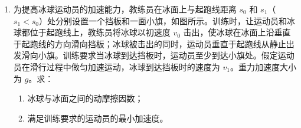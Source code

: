 \documentclass[\gkver]{gaokaozhenti}
\begin{document}
\begin{enumerate}
{	③将电阻箱 $R_z$ 的阻值置于 $2500.0 \UO$，接通 $S_1$；将 $R_1$ 的滑片置于适当位置，再反复调节 $R_2$ 的滑片 D 的位置；最终使得接通 $S_2$ 前后，微安表的示数保持不变，这说明 $S_2$ 接通前后在 $BD$ 中无电流流过，可知 B 与 D 所在位置的电势相等；

	④设滑片 P 两侧电阻分别为 $R_{21}$ 和 $R_{22}$，因 B 与 D 所在位置的电势相等，可知
	$\frac{R_{z1}}{R_{21}} = \frac{R_A}{R_{22}}$

	同理当 $R_z$ 和微安表对调后，仍有
	$\frac{R_A}{R_{21}} = \frac{R_{z2}}{R_{22}}$

	联立两式解得
	$R_A = \sqrt{R_{z1}R_{z2}} = \sqrt{2500 \times 2601} \UO = 2550 \UO$

	（3）为了提高测量精度，调节 $R_1$ 上的分压，尽可能使微安表接近满量程。
}

\item
为提高冰球运动员的加速能力，教练员在冰面上与起跑线距离 $s_0$ 和 $s_1$（$s_1 < s_0$）处分别设置一个挡板和一面小旗，如图所示。训练时，让运动员和冰球都位于起跑线上，教练员将冰球以初速度 $v_0$ 击出，使冰球在冰面上沿垂直于起跑线的方向滑向挡板；冰球被击出的同时，运动员垂直于起跑线从静止出发滑向小旗。训练要求当冰球到达挡板时，运动员至少到达小旗处。假定运动员在滑行过程中做匀加速运动，冰球到达挡板时的速度为 $v_1$。重力加速度大小为 $g$。求：
\begin{enumerate}
	\item
	冰球与冰面之间的动摩擦因数；
	\item
	满足训练要求的运动员的最小加速度。
\end{enumerate}
\onepicture[align=right, h=4.25cm]{}
\end{enumerate}
\end{document}

